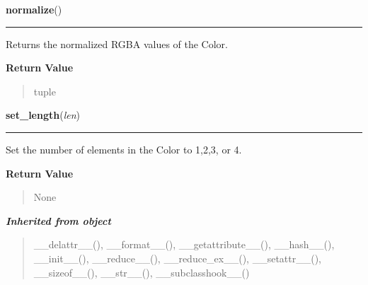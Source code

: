     \label{pygame:Color:normalize}

    \vspace{0.5ex}

\hspace{.8\funcindent}\begin{boxedminipage}{\funcwidth}

    \raggedright \textbf{normalize}()

    \vspace{-1.5ex}

    \rule{\textwidth}{0.5\fboxrule}
\setlength{\parskip}{2ex}
    Returns the normalized RGBA values of the Color.

\setlength{\parskip}{1ex}
      \textbf{Return Value}
    \vspace{-1ex}

      \begin{quote}
      tuple

      \end{quote}

    \end{boxedminipage}

    \label{pygame:Color:set_length}

    \vspace{0.5ex}

\hspace{.8\funcindent}\begin{boxedminipage}{\funcwidth}

    \raggedright \textbf{set\_length}(\textit{len})

    \vspace{-1.5ex}

    \rule{\textwidth}{0.5\fboxrule}
\setlength{\parskip}{2ex}
    Set the number of elements in the Color to 1,2,3, or 4.

\setlength{\parskip}{1ex}
      \textbf{Return Value}
    \vspace{-1ex}

      \begin{quote}
      None

      \end{quote}

    \end{boxedminipage}


\large{\textbf{\textit{Inherited from object}}}

\begin{quote}
\_\_delattr\_\_(), \_\_format\_\_(), \_\_getattribute\_\_(), \_\_hash\_\_(), \_\_init\_\_(), \_\_reduce\_\_(), \_\_reduce\_ex\_\_(), \_\_setattr\_\_(), \_\_sizeof\_\_(), \_\_str\_\_(), \_\_subclasshook\_\_()
\end{quote}

